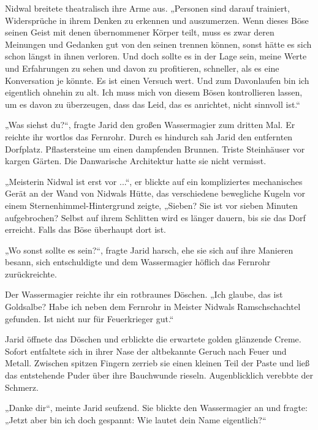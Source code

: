 Nidwal breitete theatralisch ihre Arme aus. „Personen sind darauf trainiert, Widersprüche in ihrem Denken zu erkennen und auszumerzen. Wenn dieses Böse seinen Geist mit denen übernommener Körper teilt, muss es zwar deren Meinungen und Gedanken gut von den seinen trennen können, sonst hätte es sich schon längst in ihnen verloren. Und doch sollte es in der Lage sein, meine Werte und Erfahrungen zu sehen und davon zu profitieren, schneller, als es eine Konversation je könnte. Es ist einen Versuch wert. Und zum Davonlaufen bin ich eigentlich ohnehin zu alt. Ich muss mich von diesem Bösen kontrollieren lassen, um es davon zu überzeugen, dass das Leid, das es anrichtet, nicht sinnvoll ist.“\bigskip







„Was siehst du?“, fragte Jarid den großen Wassermagier zum dritten Mal. Er reichte ihr wortlos das Fernrohr. Durch es hindurch sah Jarid den entfernten Dorfplatz. Pflastersteine um einen dampfenden Brunnen. Triste Steinhäuser vor kargen Gärten. Die Danwarische Architektur hatte sie nicht vermisst.

„Meisterin Nidwal ist erst vor ...“, er blickte auf ein kompliziertes mechanisches Gerät an der Wand von Nidwals Hütte, das verschiedene bewegliche Kugeln vor einem Sternenhimmel-Hintergrund zeigte, „Sieben? Sie ist vor sieben Minuten aufgebrochen? Selbst auf ihrem Schlitten wird es länger dauern, bis sie das Dorf erreicht. Falls das Böse überhaupt dort ist.

„Wo sonst sollte es sein?“, fragte Jarid harsch, ehe sie sich auf ihre Manieren besann, sich entschuldigte und dem Wassermagier höflich das Fernrohr zurückreichte.

Der Wassermagier reichte ihr ein rotbraunes Döschen. „Ich glaube, das ist Goldsalbe? Habe ich neben dem Fernrohr in Meister Nidwals Ramschschachtel gefunden. Ist nicht nur für Feuerkrieger gut.“

Jarid öffnete das Döschen und erblickte die erwartete golden glänzende Creme. Sofort entfaltete sich in ihrer Nase der altbekannte Geruch nach Feuer und Metall. Zwischen spitzen Fingern zerrieb sie einen kleinen Teil der Paste und ließ das entstehende Puder über ihre Bauchwunde rieseln. Augenblicklich verebbte der Schmerz.

„Danke dir“, meinte Jarid seufzend. Sie blickte den Wassermagier an und fragte: „Jetzt aber bin ich doch gespannt: Wie lautet dein Name eigentlich?“

